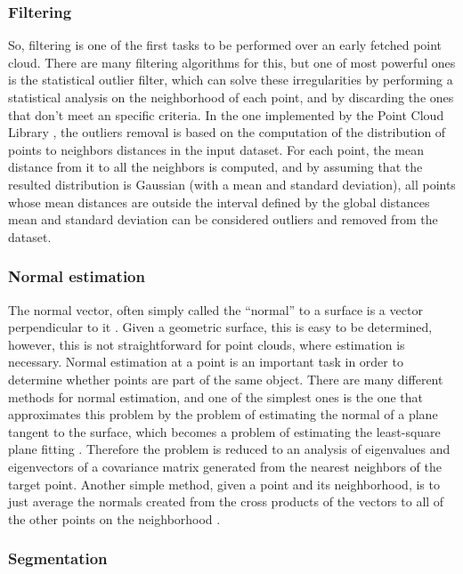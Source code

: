 \documentclass[msc, a4paper, classic, en]{ufbathesis}
\begin{document}
\subsubsection{Filtering}

So, filtering is one of the first tasks to be performed over an early fetched point cloud. There are many filtering algorithms for this, but one of most powerful ones is the statistical outlier filter, which can solve these irregularities by performing a statistical analysis on the neighborhood of each point, and by discarding the ones that don't meet an specific criteria. In the one implemented by the Point Cloud Library \cite{pclstatout}, the outliers removal is based on the computation of the distribution of points to neighbors distances in the input dataset. For each point, the mean distance from it to all the neighbors is computed, and by assuming that the resulted distribution is Gaussian (with a mean and standard deviation), all points whose mean distances are outside the interval defined by the global distances mean and standard deviation can be considered outliers and removed from the dataset.

\subsubsection{Normal estimation}

The normal vector, often simply called the ``normal'' to a surface is a vector perpendicular to it \cite{normalwolf}. Given a geometric surface, this is easy to be determined, however, this is not straightforward for point clouds, where estimation is necessary. Normal estimation at a point is an important task in order to determine whether points are part of the same object. There are many different methods for normal estimation, and one of the simplest ones is the one that approximates this problem by the problem of estimating the normal of a plane tangent to the surface, which becomes a problem of estimating the least-square plane fitting \cite{pclnormal}. Therefore the problem is reduced to an analysis of eigenvalues and eigenvectors of a covariance matrix generated from the nearest neighbors of the target point. Another simple method, given a point and its neighborhood, is to just average the normals created from the cross products of the vectors to all of the other points on the neighborhood \cite{price2012}.

\subsubsection{Segmentation}
\end{document}
